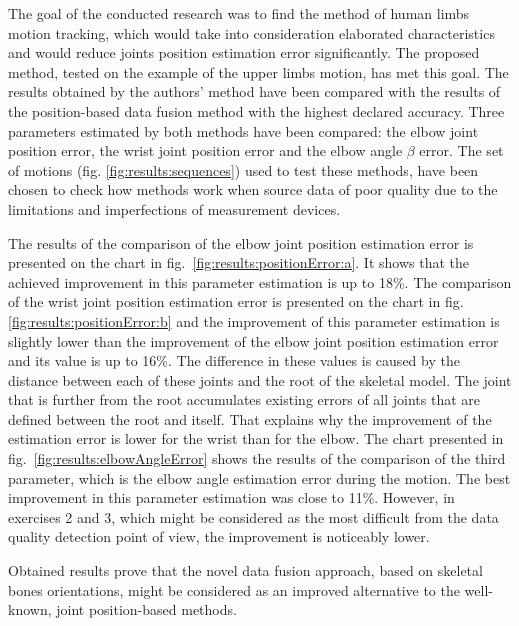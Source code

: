 \documentclass[sensors,article,submit,moreauthors,pdftex,10pt,a4paper]{mdpi}
\begin{document}
The goal of the conducted research was to find the method of human limbs motion tracking, which would take into consideration elaborated characteristics and would reduce joints position estimation error significantly. The proposed method, tested on the example of the upper limbs motion, has met this goal. The results obtained by the authors' method have been compared with the results of the position-based data fusion method with the highest declared accuracy. Three parameters estimated by both methods have been compared: the elbow joint position error, the wrist joint position error and the elbow angle $\beta$ error. The set of motions (fig. \ref{fig:results:sequences}) used to test these methods, have been chosen to check how methods work when source data of poor quality due to the limitations and imperfections of measurement devices.
	
The results of the comparison of the elbow joint position estimation error is presented on the chart in fig.~\ref{fig:results:positionError:a}. It shows that the achieved improvement in this parameter estimation is up to 18\%. The comparison of the wrist joint position estimation error is presented on the chart in fig. \ref{fig:results:positionError:b} and the improvement of this parameter estimation is slightly lower than the improvement of the elbow joint position estimation error and its value is up to 16\%. The difference in these values is caused by the distance between each of these joints and the root of the skeletal model. The joint that is further from the root accumulates existing errors of all joints that are defined between the root and itself. That explains why the improvement of the estimation error is lower for the wrist than for the elbow. The chart presented in fig.~\ref{fig:results:elbowAngleError} shows the results of the comparison of the third parameter, which is the elbow angle estimation error during the motion. The best improvement in this parameter estimation was close to 11\%. However, in exercises 2 and 3, which might be considered as the most difficult from the data quality detection point of view, the improvement is noticeably lower.
	
Obtained results prove that the novel data fusion approach, based on skeletal bones orientations, might be considered as an improved alternative to the well-known, joint position-based methods.
		
		
\vspace{6pt} 
		
		
\end{document}
